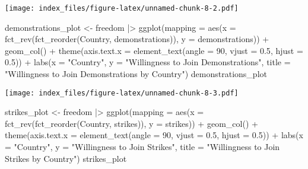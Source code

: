 \documentclass[
]{article}
\newenvironment{Shaded}{\begin{snugshade}}{\end{snugshade}}
\newcommand{\AttributeTok}[1]{\textcolor[rgb]{0.77,0.63,0.00}{#1}}
\newcommand{\DecValTok}[1]{\textcolor[rgb]{0.00,0.00,0.81}{#1}}
\newcommand{\FloatTok}[1]{\textcolor[rgb]{0.00,0.00,0.81}{#1}}
\newcommand{\FunctionTok}[1]{\textcolor[rgb]{0.00,0.00,0.00}{#1}}
\newcommand{\NormalTok}[1]{#1}
\newcommand{\OtherTok}[1]{\textcolor[rgb]{0.56,0.35,0.01}{#1}}
\newcommand{\SpecialCharTok}[1]{\textcolor[rgb]{0.00,0.00,0.00}{#1}}
\newcommand{\StringTok}[1]{\textcolor[rgb]{0.31,0.60,0.02}{#1}}
\begin{document}
\texttt{[image: index\_files/figure-latex/unnamed-chunk-8-2.pdf]}

\begin{Shaded}
\begin{Highlighting}[]
\NormalTok{demonstrations\_plot }\OtherTok{\textless{}{-}}\NormalTok{ freedom }\SpecialCharTok{|\textgreater{}}
  \FunctionTok{ggplot}\NormalTok{(}\AttributeTok{mapping =} \FunctionTok{aes}\NormalTok{(}\AttributeTok{x =} \FunctionTok{fct\_rev}\NormalTok{(}\FunctionTok{fct\_reorder}\NormalTok{(Country, demonstrations)),}
                       \AttributeTok{y =}\NormalTok{ demonstrations)) }\SpecialCharTok{+}
  \FunctionTok{geom\_col}\NormalTok{() }\SpecialCharTok{+}
  \FunctionTok{theme}\NormalTok{(}\AttributeTok{axis.text.x =} \FunctionTok{element\_text}\NormalTok{(}\AttributeTok{angle =} \DecValTok{90}\NormalTok{,}
                                   \AttributeTok{vjust =} \FloatTok{0.5}\NormalTok{,}
                                   \AttributeTok{hjust =} \FloatTok{0.5}\NormalTok{)) }\SpecialCharTok{+}
  \FunctionTok{labs}\NormalTok{(}\AttributeTok{x =} \StringTok{"Country"}\NormalTok{,}
       \AttributeTok{y =} \StringTok{"Willingness to Join Demonstrations"}\NormalTok{,}
       \AttributeTok{title =} \StringTok{"Willingness to Join Demonstrations by Country"}\NormalTok{)}
\NormalTok{demonstrations\_plot}
\end{Highlighting}
\end{Shaded}

\texttt{[image: index\_files/figure-latex/unnamed-chunk-8-3.pdf]}

\begin{Shaded}
\begin{Highlighting}[]
\NormalTok{strikes\_plot }\OtherTok{\textless{}{-}}\NormalTok{ freedom }\SpecialCharTok{|\textgreater{}}
  \FunctionTok{ggplot}\NormalTok{(}\AttributeTok{mapping =} \FunctionTok{aes}\NormalTok{(}\AttributeTok{x =} \FunctionTok{fct\_rev}\NormalTok{(}\FunctionTok{fct\_reorder}\NormalTok{(Country, strikes)),}
                       \AttributeTok{y =}\NormalTok{ strikes)) }\SpecialCharTok{+}
  \FunctionTok{geom\_col}\NormalTok{() }\SpecialCharTok{+}
  \FunctionTok{theme}\NormalTok{(}\AttributeTok{axis.text.x =} \FunctionTok{element\_text}\NormalTok{(}\AttributeTok{angle =} \DecValTok{90}\NormalTok{,}
                                   \AttributeTok{vjust =} \FloatTok{0.5}\NormalTok{,}
                                   \AttributeTok{hjust =} \FloatTok{0.5}\NormalTok{)) }\SpecialCharTok{+}
  \FunctionTok{labs}\NormalTok{(}\AttributeTok{x =} \StringTok{"Country"}\NormalTok{,}
       \AttributeTok{y =} \StringTok{"Willingness to Join Strikes"}\NormalTok{,}
       \AttributeTok{title =} \StringTok{"Willingness to Join Strikes by Country"}\NormalTok{)}
\NormalTok{strikes\_plot}
\end{Highlighting}
\end{Shaded}
\end{document}
